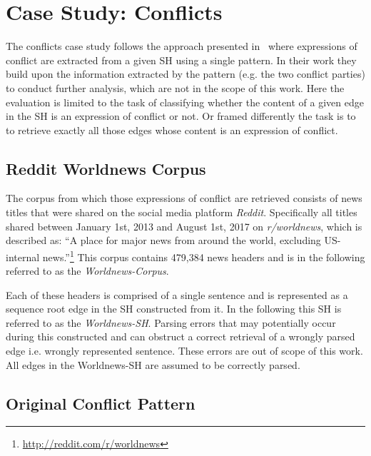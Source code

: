 \documentclass[11pt]{scrreprt}
\let\cite\parencite  %
\begin{document}
\section{Case Study: Conflicts}
The conflicts case study follows the approach presented in \cite[p.~22]{menezesSemanticHypergraphs2021} where expressions of conflict are extracted from a given SH using a single pattern. In their work they build upon the information extracted by the pattern (e.g. the two conflict parties) to conduct further analysis, which are not in the scope of this work. Here the evaluation is limited to the task of classifying whether the content of a given edge in the SH is an expression of conflict or not. Or framed differently the task is to to retrieve exactly all those edges whose content is an expression of conflict.


\subsection{Reddit Worldnews Corpus}
The corpus from which those expressions of conflict are retrieved consists of news titles that were shared on the social media platform \textit{Reddit}. Specifically all titles shared between January 1st, 2013 and August 1st, 2017 on \textit{r/worldnews}, which is described as: “A place for major news from around the world, excluding US-internal news.”\footnote{\url{http://reddit.com/r/worldnews}} This corpus contains 479,384 news headers and is in the following referred to as the \textit{Worldnews-Corpus}.

Each of these headers is comprised of a single sentence and is represented as a sequence root edge in the SH constructed from it. In the following this SH is referred to as the \textit{Worldnews-SH}. Parsing errors that may potentially occur during this constructed and can obstruct a correct retrieval of a wrongly parsed edge i.e. wrongly represented sentence. These errors are out of scope of this work. All edges in the Worldnews-SH are assumed to be correctly parsed.

\subsection{Original Conflict Pattern}
\end{document}
